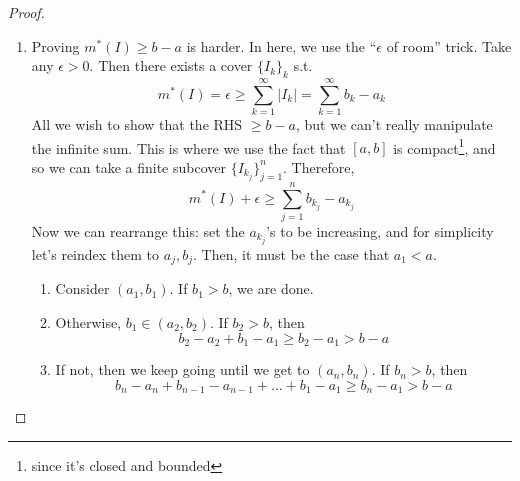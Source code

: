 \begin{proof}
\begin{enumerate}
      \item Proving $m^\ast (I) \geq b - a$ is harder. In here, we use the ``$\epsilon$ of room'' trick. Take any $\epsilon > 0$. Then there exists a cover $\{I_k\}_k$ s.t. 
      \begin{equation}
        m^\ast(I) = \epsilon \geq \sum_{k=1}^\infty |I_k| = \sum_{k=1}^\infty b_k - a_k
      \end{equation}
      All we wish to show that the RHS $\geq b - a$, but we can't really manipulate the infinite sum. This is where we use the fact that $[a, b]$ is compact\footnote{since it's closed and bounded}, and so we can take a finite subcover $\{I_{k_j}\}_{j=1}^n$. Therefore, 
      \begin{equation}
        m^\ast (I) + \epsilon  \geq \sum_{j=1}^n b_{k_j} - a_{k_j} 
      \end{equation}
      Now we can rearrange this: set the $a_{k_j}$'s to be increasing, and for simplicity let's reindex them to $a_j, b_j$. Then, it must be the case that $a_1 < a$. 
      \begin{enumerate}
        \item Consider $(a_1, b_1)$. If $b_1 > b$, we are done. 
        \item Otherwise, $b_1 \in (a_2, b_2)$. If $b_2 > b$, then 
        \begin{equation}
          b_2 - a_2 + b_1 - a_1 \geq b_2 - a_1 > b - a
        \end{equation}
        \item If not, then we keep going until we get to $(a_n, b_n)$. If $b_n > b$, then 
          \begin{equation}
            b_n - a_n + b_{n-1} - a_{n-1} + \ldots + b_1 - a_1 \geq b_n - a_1  > b - a
          \end{equation}
      \end{enumerate}
    \end{enumerate}
  \end{proof}

